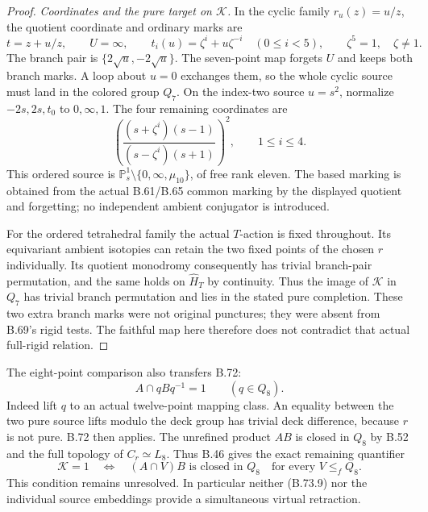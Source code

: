 \begin{proof}
\emph{Coordinates and the pure target on \(\mathcal K\).}
In the cyclic family \(r_u(z)=u/z\), the quotient coordinate
and ordinary marks are
\[
 t=z+u/z,\qquad U=\infty,\qquad
 t_i(u)=\zeta^i+u\zeta^{-i}\quad(0\leq i<5),\qquad
 \zeta^5=1,\quad\zeta\ne1.                                    \tag{B.73.7}
\]
The branch pair is \(\{2\sqrt u,-2\sqrt u\}\).
The seven-point map forgets \(U\) and keeps both branch
marks.  A loop about \(u=0\) exchanges them, so the whole
cyclic source must land in the colored group \(Q_7\).
On the index-two source \(u=s^2\), normalize
\(-2s,2s,t_0\) to \(0,\infty,1\).
The four remaining coordinates are
\[
       \left(
       \frac{(s+\zeta^i)(s-1)}
            {(s-\zeta^i)(s+1)}
       \right)^2,\qquad 1\leq i\leq4.                          \tag{B.73.8}
\]
This ordered source is
\(\mathbb P^1_s\setminus\{0,\infty,\mu_{10}\}\), of free
rank eleven.
The based marking is obtained from the actual B.61/B.65
common marking by the displayed quotient and forgetting;
no independent ambient conjugator is introduced.

For the ordered tetrahedral family the actual \(T\)-action
is fixed throughout.  Its equivariant ambient isotopies
can retain the two fixed points of the chosen \(r\)
individually.  Its quotient monodromy consequently has
trivial branch-pair permutation, and the same holds on
\(\widehat H_T\) by continuity.
Thus the image of \(\mathcal K\) in \(Q_7\) has trivial
branch permutation and lies in the stated pure completion.
These two extra branch marks were not original punctures;
they were absent from B.69's rigid tests.
The faithful map here therefore does not contradict
that actual full-rigid relation.
\end{proof}

The eight-point comparison also transfers B.72:
\[
                    A\cap qBq^{-1}=1
                              \qquad(q\in Q_8).                \tag{B.73.9}
\]
Indeed lift \(q\) to an actual twelve-point mapping class.
An equality between the two pure source lifts modulo the
deck group has trivial deck difference, because \(r\)
is not pure.  B.72 then applies.
The unrefined product \(AB\) is closed in \(Q_8\) by B.52
and the full topology of \(C_r\simeq L_8\).
Thus B.46 gives the exact remaining quantifier
\[
 \mathcal K=1\quad\Longleftrightarrow\quad
 (A\cap V)B\text{ is closed in }Q_8
                    \quad\text{for every }V\leq_f Q_8.         \tag{B.73.10}
\]
This condition remains unresolved.
In particular neither (B.73.9) nor the individual source
embeddings provide a simultaneous virtual retraction.

